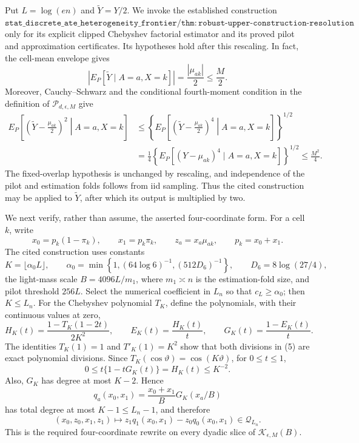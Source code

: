 Put \(L=\log(en)\) and \(\widetilde Y=Y/2\).  We invoke the established
construction
\(\mathtt{stat\_discrete\_ate\_heterogeneity\_frontier/
thm:robust\text{-}upper\text{-}construction\text{-}resolution}\) only for
its explicit clipped Chebyshev factorial estimator and its proved pilot and
approximation certificates.  Its hypotheses hold after this rescaling.  In
fact, the cell-mean envelope gives
\[
 \left|E_P[\widetilde Y\mid A=a,X=k]\right|
 =\frac{|\mu_{ak}|}{2}\le \frac M2.
\tag{1}
\]
Moreover, Cauchy--Schwarz and the conditional fourth-moment condition in the
definition of \(\mathcal P_{d,\epsilon,M}\) give
\[
 \begin{split}
 E_P\!\left[\left(\widetilde Y-\frac{\mu_{ak}}2\right)^2
       \middle|A=a,X=k\right]
 &\le
 \left\{E_P\!\left[\left(\widetilde Y-\frac{\mu_{ak}}2\right)^4
       \middle|A=a,X=k\right]\right\}^{1/2}\\
 &=\frac14
 \left\{E_P[(Y-\mu_{ak})^4\mid A=a,X=k]\right\}^{1/2}
 \le\frac{M^2}{4}.
 \end{split}
\tag{2}
\]
The fixed-overlap hypothesis is unchanged by rescaling, and independence of
the pilot and estimation folds follows from iid sampling.  Thus the cited
construction may be applied to \(\widetilde Y\), after which its output is
multiplied by two.

We next verify, rather than assume, the asserted four-coordinate form.  For a
cell \(k\), write
\[
 x_0=p_k(1-\pi_k),\qquad x_1=p_k\pi_k,\qquad
 z_a=x_a\mu_{ak},\qquad p_k=x_0+x_1.
\tag{3}
\]
The cited construction uses constants
\[
 K=\lfloor\alpha_0L\rfloor,\qquad
 \alpha_0=\min\left\{1,(64\log6)^{-1},(512D_6)^{-1}\right\},
 \qquad D_6=8\log(27/4),
\tag{4}
\]
the light-mass scale \(B=4096L/m_1\), where \(m_1\asymp n\) is the
estimation-fold size, and pilot threshold \(256L\).  Select the numerical
coefficient in \(L_n\) so that \(c_L\ge\alpha_0\); then \(K\le L_n\).
For the Chebyshev polynomial \(T_K\), define the polynomials, with their
continuous values at zero,
\[
 H_K(t)=\frac{1-T_K(1-2t)}{2K^2},\qquad
 E_K(t)=\frac{H_K(t)}t,\qquad
 G_K(t)=\frac{1-E_K(t)}t.
\tag{5}
\]
The identities \(T_K(1)=1\) and \(T'_K(1)=K^2\) show that both divisions in
(5) are exact polynomial divisions.  Since
\(T_K(\cos\vartheta)=\cos(K\vartheta)\), for \(0\le t\le1\),
\[
 0\le t\{1-tG_K(t)\}=H_K(t)\le K^{-2}.
\tag{6}
\]
Also, \(G_K\) has degree at most \(K-2\).  Hence
\[
 q_a(x_0,x_1)=\frac{x_0+x_1}{B}G_K(x_a/B)
\tag{7}
\]
has total degree at most \(K-1\le L_n-1\), and therefore
\[
 (x_0,z_0,x_1,z_1)\longmapsto
 z_1q_1(x_0,x_1)-z_0q_0(x_0,x_1)
 \in\mathscr Q_{L_n}.
\tag{8}
\]
This is the required four-coordinate rewrite on every dyadic slice of
\(\mathcal K_{\epsilon,M}(B)\).

